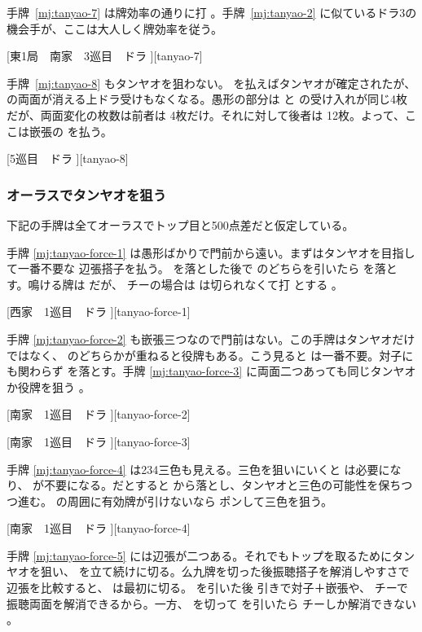 \documentclass[../nankiru_main.tex]{subfiles}
\begin{document}
手牌~\ref{mj:tanyao-7} は牌効率の通りに打 。手牌~\ref{mj:tanyao-2} に似ているドラ3の機会手が、ここは大人しく牌効率を従う。

[東1局　南家　3巡目　ドラ ][tanyao-7]

手牌~\ref{mj:tanyao-8} もタンヤオを狙わない。 を払えばタンヤオが確定されたが、 の両面が消える上ドラ受けもなくなる。愚形の部分は  と  の受け入れが同じ4枚だが、両面変化の枚数は前者は  4枚だけ。それに対して後者は  12枚。よって、ここは嵌張の  を払う\citep[][pp.~32--33]{fkt}。

[5巡目　ドラ ][tanyao-8]


\subsubsection*{オーラスでタンヤオを狙う}

下記の手牌は全てオーラスでトップ目と500点差だと仮定している。

手牌 \ref{mj:tanyao-force-1} は愚形ばかりで門前から遠い。まずはタンヤオを目指して一番不要な  辺張搭子を払う。 を落とした後で  のどちらを引いたら  を落とす。鳴ける牌は  だが、 チーの場合は  は切られなくて打  とする \citep[][pp.~11--12]{kawamura-naki}。

[西家　1巡目　ドラ ][tanyao-force-1]

手牌 \ref{mj:tanyao-force-2} も嵌張三つなので門前はない。この手牌はタンヤオだけではなく、 のどちらかが重ねると役牌もある。こう見ると  は一番不要。対子にも関わらず  を落とす。手牌 \ref{mj:tanyao-force-3} に両面二つあっても同じタンヤオか役牌を狙う \citep[][pp.~27--28]{kawamura-naki}。

[南家　1巡目　ドラ ][tanyao-force-2]

[南家　1巡目　ドラ ][tanyao-force-3]

手牌 \ref{mj:tanyao-force-4} は234三色も見える。三色を狙いにいくと  は必要になり、 が不要になる。だとすると  から落とし、タンヤオと三色の可能性を保ちつつ進む。 の周囲に有効牌が引けないなら  ポンして三色を狙う。

[南家　1巡目　ドラ ][tanyao-force-4]

手牌 \ref{mj:tanyao-force-5} には辺張が二つある。それでもトップを取るためにタンヤオを狙い、 を立て続けに切る。么九牌を切った後振聴搭子を解消しやすさで辺張を比較すると、 は最初に切る。 を引いた後  引きで対子＋嵌張や、 チーで振聴両面を解消できるから。一方、 を切って  を引いたら  チーしか解消できない \citep[][pp.~53--54]{kawamura-naki}。
\end{document}
